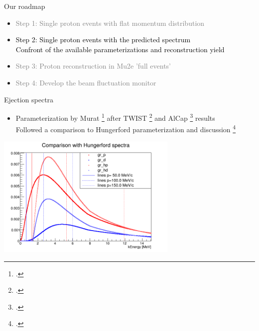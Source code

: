 \documentclass[10pt]{beamer}
\begin{document}
\begin{frame}{Our roadmap}
\begin{itemize}
\setlength\itemsep{0.4cm}
\item \textcolor{gray}{Step 1: Single proton events with flat momentum distribution}
\item \textcolor{black}{Step 2: Single proton events with the predicted spectrum\\
Confront of the available parameterizations and reconstruction yield}
\item \textcolor{gray}{Step 3: Proton reconstruction in Mu2e 'full events'}
\item \textcolor{gray}{Step 4: Develop the beam fluctuation monitor}
\end{itemize}
\end{frame}

%
\begin{frame}{Ejection spectra}
\begin{itemize}
\item Parameterization by Murat \footcite{Pasha:spectra} after TWIST \footcite{TWIST:2020} and AlCap \footcite{AlCap:2020} results\\
{\small Followed a comparison to Hungerford parameterization and discussion \footcite{io:sobottka}}
\end{itemize}

\begin{center}
\includegraphics[width=0.65\textwidth]{mu2e_spectra_articles/comparison2}
\end{center}
\end{frame}
\end{document}
